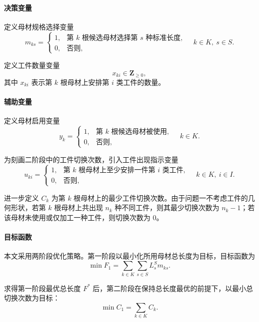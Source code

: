 \documentclass[UTF8]{ctexart}
\begin{document}
\paragraph{决策变量}

定义母材规格选择变量
\[
m_{ks}=
\begin{cases}
1, & \text{第 }k\text{ 根候选母材选择第 }s\text{ 种标准长度},\\
0, & \text{否则},
\end{cases}
\quad k\in K,\ s\in S.
\]

定义工件数量变量
\[
x_{ki}\in \mathbf{Z}_{\ge 0},
\]
其中 $x_{ki}$ 表示第 $k$ 根母材上安排第 $i$ 类工件的数量。

\paragraph{辅助变量}

定义母材启用变量
\[
y_k=
\begin{cases}
1, & \text{第 }k\text{ 根候选母材被使用},\\
0, & \text{否则},
\end{cases}
\quad k\in K.
\]

为刻画二阶段中的工件切换次数，引入工件出现指示变量
\[
u_{ki}=
\begin{cases}
1, & \text{第 }k\text{ 根母材上至少安排一件第 }i\text{ 类工件},\\
0, & \text{否则},
\end{cases}
\quad k\in K,\ i\in I.
\]

进一步定义 $C_k$ 为第 $k$ 根母材上的最少工件切换次数。由于问题一不考虑工件的几何形状，若第 $k$ 根母材上共出现 $n_k$ 种不同工件，则其最少切换次数为 $n_k-1$；若该母材未使用或仅加工一种工件，则切换次数为 $0$。

\paragraph{目标函数}

本文采用两阶段优化策略。第一阶段以最小化所用母材总长度为目标，目标函数为
\begin{equation}
\min F_1=\sum_{k\in K}\sum_{s\in S}L_s^S m_{ks}.
\label{eq:p1_obj1}
\end{equation}

求得第一阶段最优总长度 $F^*$ 后，第二阶段在保持总长度最优的前提下，以最小总切换次数为目标：
\begin{equation}
\min C_1=\sum_{k\in K}C_k.
\label{eq:p1_obj2}
\end{equation}
\end{document}
